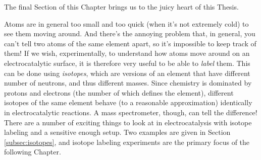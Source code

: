 The final Section of this Chapter brings us to the juicy heart of this Thesis. 

Atoms are in general too small and too quick (when it's not extremely cold) to see them moving around. And there's the annoying problem that, in general, you can't tell two atoms of the same element apart, so it's impossible to keep track of them! If we wish, experimentally, to understand how atoms move around on an electrocatalytic surface, it is therefore very useful to be able to \textit{label} them. This can be done using \textit{isotopes}, which are versions of an element that have different number of neutrons, and thus different masses. Since chemistry is dominated by protons and electrons (the number of which defines the element), different isotopes of the same element behave (to a reasonable approximation) identically in electrocatalytic reactions. A mass spectrometer, though, can tell the difference! There are a number of exciting things to look at in electrocatalysis with isotope labeling and a sensitive enough setup. Two examples are given in Section \ref{subsec:isotopes}, and isotope labeling experiments are the primary focus of the following Chapter.

